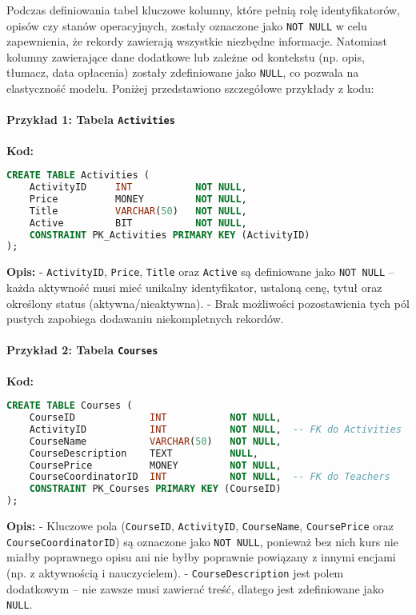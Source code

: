 \documentclass[12pt]{article}
\begin{document}
Podczas definiowania tabel kluczowe kolumny, które pełnią rolę identyfikatorów, opisów czy stanów operacyjnych, zostały oznaczone jako \texttt{NOT NULL} w celu zapewnienia, że rekordy zawierają wszystkie niezbędne informacje. Natomiast kolumny zawierające dane dodatkowe lub zależne od kontekstu (np. opis, tłumacz, data opłacenia) zostały zdefiniowane jako \texttt{NULL}, co pozwala na elastyczność modelu. Poniżej przedstawiono szczegółowe przykłady z kodu:

\paragraph{Przykład 1: Tabela \texttt{Activities}}  
\textbf{Kod:}
\begin{lstlisting}[language=SQL]
CREATE TABLE Activities (
    ActivityID     INT           NOT NULL,
    Price          MONEY         NOT NULL,
    Title          VARCHAR(50)   NOT NULL,
    Active         BIT           NOT NULL,
    CONSTRAINT PK_Activities PRIMARY KEY (ActivityID)
);
\end{lstlisting}
\textbf{Opis:}  
- \texttt{ActivityID}, \texttt{Price}, \texttt{Title} oraz \texttt{Active} są definiowane jako \texttt{NOT NULL} – każda aktywność musi mieć unikalny identyfikator, ustaloną cenę, tytuł oraz określony status (aktywna/nieaktywna).  
- Brak możliwości pozostawienia tych pól pustych zapobiega dodawaniu niekompletnych rekordów.

\paragraph{Przykład 2: Tabela \texttt{Courses}}  
\textbf{Kod:}
\begin{lstlisting}[language=SQL]
CREATE TABLE Courses (
    CourseID             INT           NOT NULL,
    ActivityID           INT           NOT NULL,  -- FK do Activities
    CourseName           VARCHAR(50)   NOT NULL,
    CourseDescription    TEXT          NULL,
    CoursePrice          MONEY         NOT NULL,
    CourseCoordinatorID  INT           NOT NULL,  -- FK do Teachers
    CONSTRAINT PK_Courses PRIMARY KEY (CourseID)
);
\end{lstlisting}
\textbf{Opis:}  
- Kluczowe pola (\texttt{CourseID}, \texttt{ActivityID}, \texttt{CourseName}, \texttt{CoursePrice} oraz \texttt{CourseCoordinatorID}) są oznaczone jako \texttt{NOT NULL}, ponieważ bez nich kurs nie miałby poprawnego opisu ani nie byłby poprawnie powiązany z innymi encjami (np. z aktywnością i nauczycielem).  
- \texttt{CourseDescription} jest polem dodatkowym – nie zawsze musi zawierać treść, dlatego jest zdefiniowane jako \texttt{NULL}.
\end{document}

